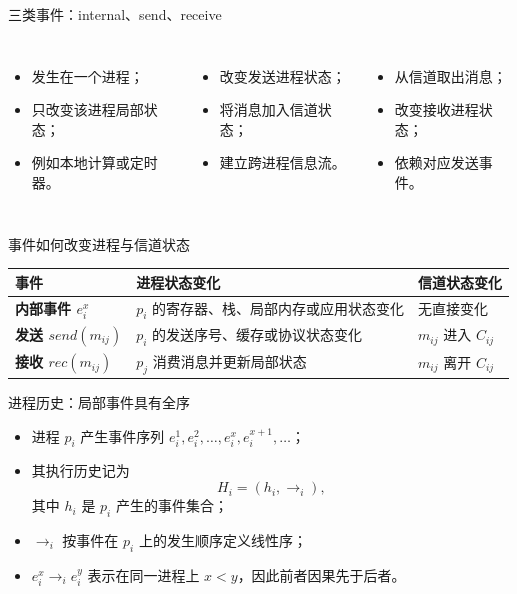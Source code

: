 \documentclass[UTF8,fontset=none,aspectratio=169,10pt]{beamer}
\begin{document}
\begin{frame}{三类事件：internal、send、receive}
\begin{columns}[T,onlytextwidth]
\begin{itemize}\item 发生在一个进程；\item 只改变该进程局部状态；\item 例如本地计算或定时器。\end{itemize}
\begin{itemize}\item 改变发送进程状态；\item 将消息加入信道状态；\item 建立跨进程信息流。\end{itemize}
\begin{itemize}\item 从信道取出消息；\item 改变接收进程状态；\item 依赖对应发送事件。\end{itemize}
\end{columns}
\end{frame}

\begin{frame}{事件如何改变进程与信道状态}
\scriptsize
\begin{tabularx}{\linewidth}{>{\bfseries}p{2.2cm}X X}
\toprule
事件 & 进程状态变化 & 信道状态变化 \\
\midrule
内部事件 $e_i^x$ & $p_i$ 的寄存器、栈、局部内存或应用状态变化 & 无直接变化 \\
发送 $send(m_{ij})$ & $p_i$ 的发送序号、缓存或协议状态变化 & $m_{ij}$ 进入 $C_{ij}$ \\
接收 $rec(m_{ij})$ & $p_j$ 消费消息并更新局部状态 & $m_{ij}$ 离开 $C_{ij}$ \\
\bottomrule
\end{tabularx}
\vfill
{}
\end{frame}

\begin{frame}{进程历史：局部事件具有全序}
\begin{itemize}
  \item 进程 $p_i$ 产生事件序列 $e_i^1,e_i^2,\ldots,e_i^x,e_i^{x+1},\ldots$；
  \item 其执行历史记为
  \[
    H_i=(h_i,\rightarrow_i),
  \]
  其中 $h_i$ 是 $p_i$ 产生的事件集合；
  \item $\rightarrow_i$ 按事件在 $p_i$ 上的发生顺序定义线性序；
  \item $e_i^x\rightarrow_i e_i^y$ 表示在同一进程上 $x<y$，因此前者因果先于后者。
\end{itemize}
\vfill
{}
\end{frame}
\end{document}
